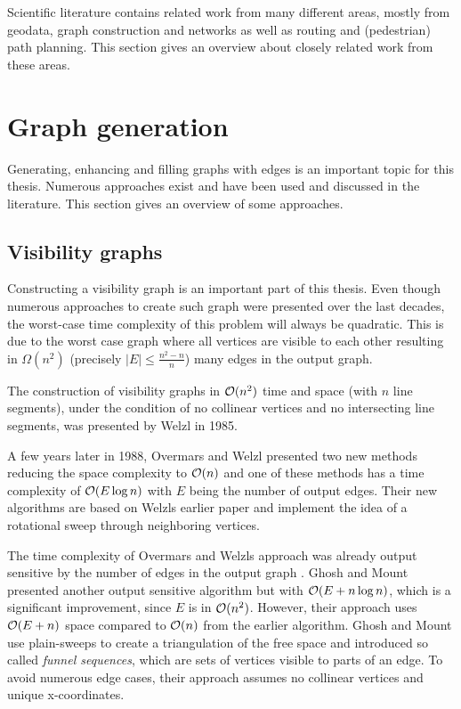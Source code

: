 
Scientific literature contains related work from many different areas, mostly from geodata, graph construction and networks as well as routing and (pedestrian) path planning.
This section gives an overview about closely related work from these areas.

\section{Graph generation}

	Generating, enhancing and filling graphs with edges is an important topic for this thesis.
	Numerous approaches exist and have been used and discussed in the literature.
	This section gives an overview of some approaches.

	\subsection{Visibility graphs}
	\label{subsec:related-work:visibility-graph}

		Constructing a visibility graph is an important part of this thesis.
		Even though numerous approaches to create such graph were presented over the last decades, the worst-case time complexity of this problem will always be quadratic.
		This is due to the worst case graph where all vertices are visible to each other resulting in $\Omega(n^2)$ (precisely $|E| \leq \frac{n^2-n}{n}$) many edges in the output graph.
		
		The construction of visibility graphs in $\mathcal{O}(n^2)$ time and space (with $n$ line segments), under the condition of no collinear vertices and no intersecting line segments, was presented by Welzl in 1985\cite{welzl-visibility-graph}.
		
		A few years later in 1988, Overmars and Welzl presented two new methods reducing the space complexity to $\mathcal{O}(n)$ \cite{overmars-weizl-visibility-graph} and one of these methods has a time complexity of $\mathcal{O}(E \log n)$ with $E$ being the number of output edges.
		Their new algorithms are based on Welzls earlier paper and implement the idea of a rotational sweep through neighboring vertices.
		
		The time complexity of Overmars and Welzls approach was already output sensitive by the number of edges in the output graph \cite{ghosh-output-sensitive-vgraph}.
		Ghosh and Mount presented another output sensitive algorithm but with $\mathcal{O}(E + n \log n)$, which is a significant improvement, since $E$ is in $\mathcal{O}(n^2)$.
		However, their approach uses $\mathcal{O}(E + n)$ space compared to $\mathcal{O}(n)$ from the earlier algorithm.
		Ghosh and Mount use plain-sweeps to create a triangulation of the free space and introduced so called \emph{funnel sequences}, which are sets of vertices visible to parts of an edge.
		To avoid numerous edge cases, their approach assumes no collinear vertices and unique x-coordinates.
		
